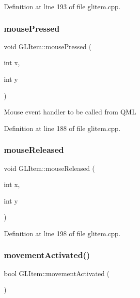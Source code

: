 Definition at line 193 of file glitem.\+cpp.

\mbox{\label{class_g_l_item_aba4710ee3d504c893e493a2a9f48efd0}} 
\subsubsection{\texorpdfstring{mousePressed}{mousePressed}}
{\footnotesize\ttfamily void G\+L\+Item\+::mouse\+Pressed (\begin{DoxyParamCaption}\item[{int}]{x,  }\item[{int}]{y }\end{DoxyParamCaption})\hspace{0.3cm}{\ttfamily [slot]}}

Mouse event handler to be called from Q\+ML 

Definition at line 188 of file glitem.\+cpp.

\mbox{\label{class_g_l_item_aca75d031f39c19b86c69042bd39c127a}} 
\subsubsection{\texorpdfstring{mouseReleased}{mouseReleased}}
{\footnotesize\ttfamily void G\+L\+Item\+::mouse\+Released (\begin{DoxyParamCaption}\item[{int}]{x,  }\item[{int}]{y }\end{DoxyParamCaption})\hspace{0.3cm}{\ttfamily [slot]}}



Definition at line 198 of file glitem.\+cpp.

\mbox{\label{class_g_l_item_a45485508d639ce1c0855928c59bdf7db}} 
\subsubsection{\texorpdfstring{movementActivated()}{movementActivated()}}
{\footnotesize\ttfamily bool G\+L\+Item\+::movement\+Activated (\begin{DoxyParamCaption}{ }\end{DoxyParamCaption})}

